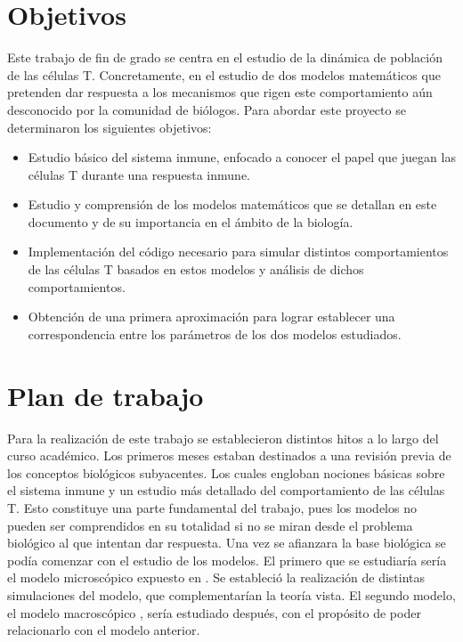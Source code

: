 \section{Objetivos}

Este trabajo de fin de grado se centra en el estudio de la dinámica de población de las células T. Concretamente, en el estudio de dos modelos matemáticos que pretenden dar respuesta a los mecanismos que rigen este comportamiento aún desconocido por la comunidad de biólogos. Para abordar este proyecto se determinaron los siguientes objetivos:

 \begin{itemize}
 	
	\item Estudio básico del sistema inmune, enfocado a conocer el papel que juegan las células T durante una respuesta inmune.
	
	\item Estudio y comprensión de los modelos matemáticos que se detallan en este documento y de su importancia en el ámbito de la biología.
	
 	\item Implementación del código necesario para simular distintos comportamientos de las células T basados en estos modelos y análisis de dichos comportamientos. 
 	
 	\item Obtención de una primera aproximación para lograr establecer una correspondencia entre los parámetros de los dos modelos estudiados. 
 \end{itemize}


\section{Plan de trabajo}

Para la realización de este trabajo se establecieron distintos hitos a lo largo del curso académico. Los primeros meses estaban destinados a una revisión previa de los conceptos biológicos subyacentes. Los cuales engloban nociones básicas sobre el sistema inmune y un estudio más detallado del comportamiento de las células T. Esto constituye una parte fundamental del trabajo, pues los modelos no pueden ser comprendidos en su totalidad si no se miran desde el problema biológico al que intentan dar respuesta. Una vez se afianzara la base biológica se podía comenzar con el estudio de los modelos. El primero que se estudiaría sería el modelo microscópico expuesto en \cite{JTB}. Se estableció la realización de distintas simulaciones del modelo, que complementarían la teoría vista. El segundo modelo, el modelo macroscópico \citep{arias2015growth}, sería estudiado después, con el propósito de poder relacionarlo con el modelo anterior. 


